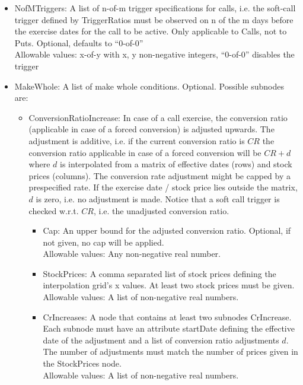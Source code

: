 \begin{itemize}
\item NofMTriggers: A list of n-of-m trigger specifications for calls, i.e. the soft-call trigger defined by
  TriggerRatios must be observed on n of the m days before the exercise dates for the call to be active. Only applicable
  to Calls, not to Puts. Optional, defaults to ``0-of-0'' \\
  Allowable values: x-of-y with x, y non-negative integers, ``0-of-0'' disables the trigger

\item MakeWhole: A list of make whole conditions. Optional. Possible subnodes are:
  \begin{itemize}
    \item ConversionRatioIncrease: In case of a call exercise, the conversion ratio (applicable in case of a forced
      conversion) is adjusted upwards. The adjustment is additive, i.e. if the current conversion ratio is $CR$ the
      conversion ratio applicable in case of a forced conversion will be $CR+d$ where $d$ is interpolated from a matrix
      of effective dates (rows) and stock prices (columns). The conversion rate adjustment might be capped by a
      prespecified rate. If the exercise date / stock price lies outside the matrix, $d$ is zero, i.e. no adjustment is
      made. Notice that a soft call trigger is checked w.r.t. $CR$, i.e. the unadjusted conversion ratio.
      \begin{itemize}
      \item Cap: An upper bound for the adjusted conversion ratio. Optional, if not given, no cap will be applied.\\
        Allowable values: Any non-negative real number.
      \item StockPrices: A comma separated list of stock prices defining the interpolation grid's x values. At least two
        stock prices must be given.\\
        Allowable values: A list of non-negative real numbers.
      \item CrIncreases: A node that contains at least two subnodes CrIncrease. Each subnode must have an attribute
        startDate defining the effective date of the adjustment and a list of conversion ratio adjustments $d$. The
        number of adjustments must match the number of prices given in the StockPrices node. \\
        Allowable values: A list of non-negative real numbers.
      \end{itemize}
  \end{itemize}

\end{itemize}

